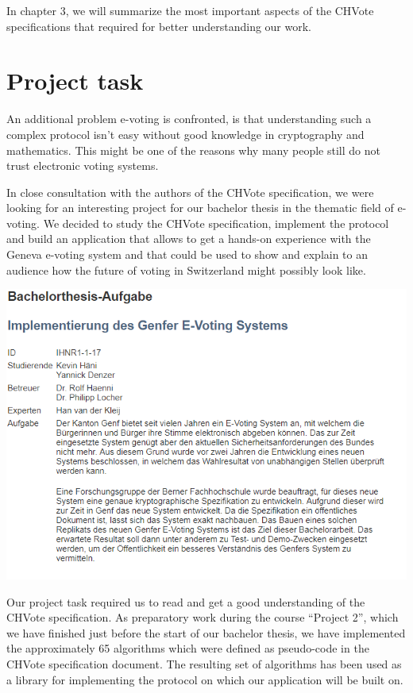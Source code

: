 In chapter 3, we will summarize the most important aspects of the CHVote specifications that required for better understanding our work.

\section{Project task}
An additional problem e-voting is confronted, is that understanding such a complex protocol isn't easy without good knowledge in cryptography and mathematics. This might be one of the reasons why many people still do not trust electronic voting systems.

In close consultation with the authors of the CHVote specification, we were looking for an interesting project for our bachelor thesis in the thematic field of e-voting. We decided to study the CHVote specification, implement the protocol and build an application that allows to get a hands-on experience with the Geneva e-voting system and that could be used to show and explain to an audience how the future of voting in Switzerland might possibly look like.

\begin{center}
\includegraphics[scale=0.95]{assets/aufgabe.PNG}
\label{Bachelor thesis task}%
\end{center}

Our project task required us to read and get a good understanding of the CHVote specification. As preparatory work during the course "`Project 2"', which we have finished just before the start of our bachelor thesis, we have implemented the approximately 65 algorithms which were defined as pseudo-code in the CHVote specification document. The resulting set of algorithms has been used as a library for implementing the protocol on which our application will be built on.

